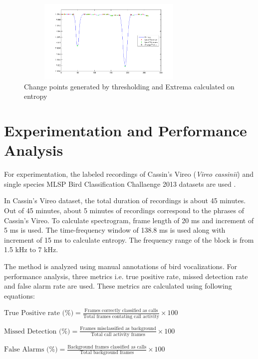 \documentclass[a4paper]{article}
\begin{document}
\begin{figure}[!ht]
	\centering
	\includegraphics[width=9cm, height=4cm]{thresholding}
	\caption{ Change points generated by thresholding and Extrema calculated on entropy}   
\end{figure} 

   




\section{Experimentation and Performance Analysis}

For experimentation, the labeled recordings of Cassin’s Vireo (\textit{Vireo cassinii}) and single species MLSP Bird Classification Challaenge 2013 datasets are used \cite{data}. 

In Cassin's Vireo dataset, the total duration of recordings is about 45 minutes. Out of 45 minutes, about 5 minutes of recordings correspond to the phrases of Cassin's Vireo. To calculate spectrogram, frame length of 20 ms and increment of  
5 ms is used. The time-frequency window of 138.8 ms is used along with increment of 15 ms to calculate entropy. The frequency range of the block is from 1.5 kHz to 7 kHz.  

The method is analyzed using manual annotations of bird vocalizations. For performance analysis, three metrics i.e. true positive rate, missed detection rate and false alarm rate are used. These metrics are calculated using following equations:\newline



$\text{True Positive rate (\%)}=\frac{\text{Frames correctly classified as calls}} {\text{Total frames contating call activity}} \times 100$\newline


$\text{Missed Detection (\%)}=\frac{\text{Frames  misclassified as background}} {\text{Total call activity frames}} \times 100$\newline

$\text{False Alarms (\%)}=\frac{\text{Background  frames classified as calls}} {\text{Total background frames}} \times 100$ \newline
\end{document}
